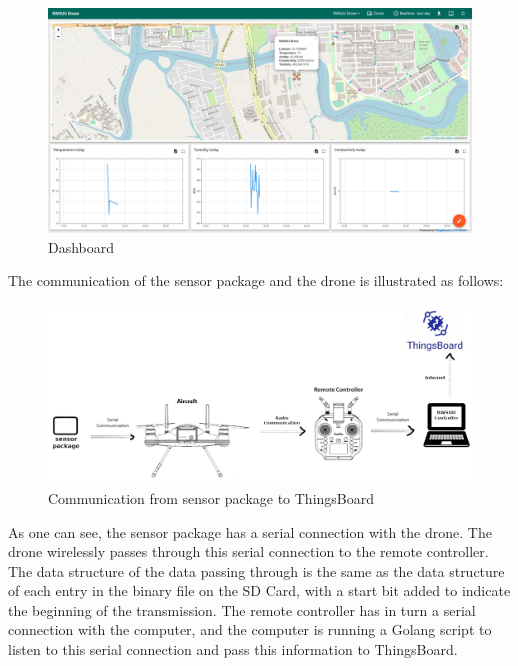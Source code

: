 \begin{figure}[h]
\centering
\includegraphics[scale=0.3]{070_design/software/63_dashboard.png}
\caption{Dashboard}
\end{figure}

The communication of the sensor package and the drone is illustrated as follows:

\begin{figure}[h]
\centering
\includegraphics[scale=1]{070_design/software/62_comms.png}
\caption{Communication from sensor package to ThingsBoard}
\end{figure}

As one can see, the sensor package has a serial connection with the drone. The drone wirelessly passes through this serial connection to the remote controller. The data structure of the data passing through is the same as the data structure of each entry in the binary file on the SD Card, with a start bit added to indicate the beginning of the transmission. The remote controller has in turn a serial connection with the computer, and the computer is running a Golang script \cite{rwsuucontroller} to listen to this serial connection and pass this information to ThingsBoard.

